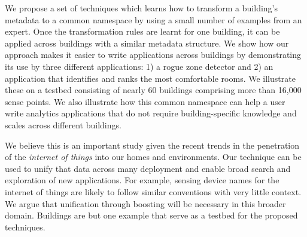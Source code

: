 We propose a set of techniques which learns how to transform a 
building's metadata 
to a common namespace by using a small number of examples from an expert. Once the transformation 
rules are learnt for one building, it can be applied across buildings with a similar 
metadata structure.  
We show how our approach makes it easier to write applications across buildings by
demonstrating its use by three different applications: 1) a rogue zone detector and 
2) an application that identifies and ranks the most comfortable
rooms. We illustrate these on a testbed consisting of nearly 60 buildings comprising more 
than 16,000 sense points. We also illustrate how this common namespace can help a user write 
analytics applications that do not require building-specific knowledge and scales across 
different buildings.

We believe this is an important study given the recent trends in the penetration
of the \emph{internet of things} into our homes and environments.
Our technique can be used to unify that data across many deployment and enable broad search 
and exploration of new applications.  For example, sensing device names for 
the internet of things are likely to follow similar conventions with very little 
context.  We argue that unification through boosting will be necessary in this broader domain.
Buildings are but one example that serve as a testbed for the proposed techniques.




 
